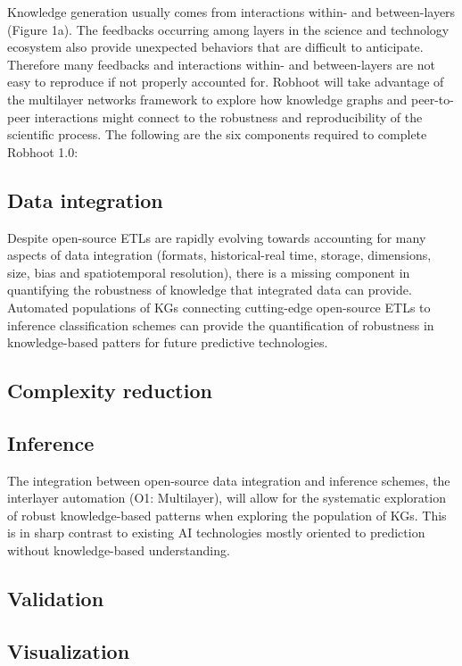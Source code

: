\documentclass[10pt, a4paper, twocolumn]{article} %
\begin{document}
  Knowledge generation usually comes from interactions within- and
  between-layers (Figure 1a). The feedbacks occurring among layers in
  the science and technology ecosystem also provide unexpected
  behaviors that are difficult to anticipate. Therefore many feedbacks
  and interactions within- and between-layers are not easy to
  reproduce if not properly accounted for. Robhoot will take advantage
  of the multilayer networks framework to explore how knowledge graphs
  and peer-to-peer interactions might connect to the robustness and
  reproducibility of the scientific process. The following are the six
  components required to complete Robhoot 1.0:

  \subsection{Data integration}
  Despite open-source ETLs are rapidly evolving towards accounting for
  many aspects of data integration (formats, historical-real time,
  storage, dimensions, size, bias and spatiotemporal resolution),
  there is a missing component in quantifying the robustness of
  knowledge that integrated data can provide. Automated populations of
  KGs connecting cutting-edge open-source ETLs to inference
  classification schemes can provide the quantification of robustness
  in knowledge-based patters for future predictive technologies.
  \subsection{Complexity reduction}

  \subsection{Inference}
  The integration between open-source data integration and inference
  schemes, the interlayer automation (O1: Multilayer), will allow for
  the systematic exploration of robust knowledge-based patterns when
  exploring the population of KGs. This is in sharp contrast to
  existing AI technologies mostly oriented to prediction without
  knowledge-based understanding. 

  \subsection{Validation}

  \subsection{Visualization}
\end{document}
